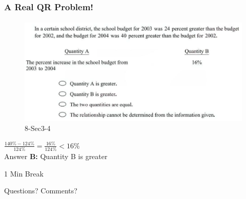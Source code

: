 \documentclass[
	11pt, %
]{beamer}
\begin{document}
\begin{frame}
	\frametitle{A Real QR Problem!}
	\framesubtitle{}
	\begin{figure}
		\includegraphics[width=\linewidth]{Percent_Increase_Example_Question1.png}
		\caption{8-Sec3-4}
	\end{figure}
	\pause
$\frac{140\% - 124\%}{124\%} = \frac{16\%}{124\%} < 16\% $ \\
\pause
\bigskip
Answer \textbf{B: } Quantity B is greater
\end{frame}



\begin{frame}[plain] %
	\begin{center}
		{\Huge 1 Min Break}
		\bigskip\bigskip %
		
		{\LARGE Questions? Comments?}
	\end{center}
\end{frame}

\end{document}
